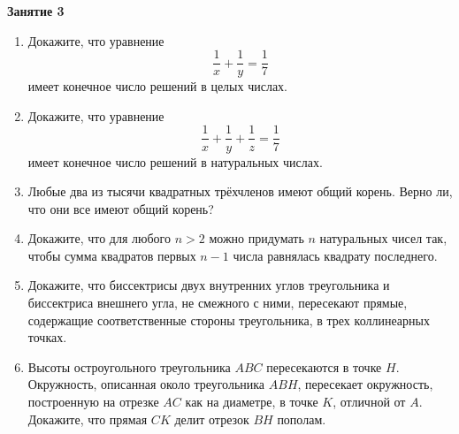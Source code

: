 \documentclass{article}
\begin{document}
\large
	
\begin{center}
	\textbf{Занятие 3}
\end{center}


\begin{enumerate}[label*=\protect\fbox{\arabic{enumi}}]
	
\item Докажите, что уравнение $$\frac{1}{x} + \frac{1}{y} = \frac{1}{7}$$ имеет конечное число решений в целых числах.
	
\item Докажите, что уравнение $$\frac{1}{x} + \frac{1}{y} + \frac{1}{z} = \frac{1}{7}$$ имеет конечное число решений в натуральных числах.

\item Любые два из тысячи квадратных трёхчленов имеют общий корень. Верно ли, что они все имеют общий корень?

\item Докажите, что для любого $n > 2$ можно придумать $n$ натуральных чисел так, чтобы сумма квадратов первых $n - 1$ числа равнялась квадрату последнего.

\item Докажите, что биссектрисы двух внутренних углов треугольника и биссектриса
внешнего угла, не смежного с ними, пересекают прямые, содержащие соответственные стороны треугольника, в трех коллинеарных точках.

\item Высоты остроугольного треугольника $ABC$ пересекаются в точке $H$. Окружность,
описанная около треугольника $ABH$, пересекает окружность, построенную на отрезке $AC$ как на диаметре, в точке $K$, отличной от $A$. Докажите, что прямая $CK$ делит
отрезок $BH$ пополам.
	
\end{enumerate}
\end{document}
